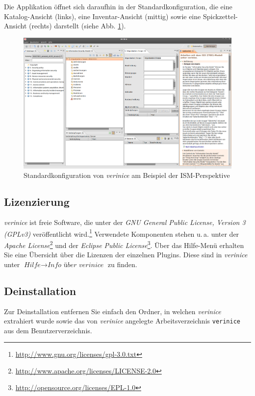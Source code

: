 \documentclass[a4paper,10pt]{book}
\newcommand{\ua}{\mbox{u.\,a.}\xspace}
\begin{document}
Die Applikation öffnet sich daraufhin in der Standardkonfiguration, die eine
Katalog-Ansicht (links), eine Inventar-Ansicht (mittig) sowie eine
Spickzettel-Ansicht (rechts) darstellt (siehe Abb.
\ref{fig:standardkonfiguration-von-verinice}).

\begin{figure}[htb!]
  \centering
  \includegraphics[scale=.21]{Screenshot/ISM-Perspektive.png}
  \caption{Standardkonfiguration von \textit{verinice} am Beispiel der
    ISM-Perspektive}
  \label{fig:standardkonfiguration-von-verinice}
\end{figure}


\subsection{Lizenzierung}

\textit{verinice} ist freie Software, die unter der \textit{GNU General Public
License, Version 3 (GPLv3)} veröffentlicht
wird.\footnote{\url{http://www.gnu.org/licenses/gpl-3.0.txt}} Verwendete
Komponenten stehen \ua unter der {\em Apache
License}\footnote{\url{http://www.apache.org/licenses/LICENSE-2.0}} und der {\em
Eclipse Public License}\footnote{\url{http://opensource.org/licenses/EPL-1.0}}.
Über das Hilfe-Menü erhalten Sie eine Übersicht über die Lizenzen der einzelnen
Plugins. Diese sind in \textit{verinice} unter $\textit{Hilfe}\to\textit{Info
über verinice}$ zu finden.


\subsection{Deinstallation}

Zur Deinstallation entfernen Sie einfach den Ordner, in welchen
\textit{verinice} extrahiert wurde sowie das von \textit{verinice} angelegte
Arbeitsverzeichnis \texttt{verinice} aus dem Benutzerverzeichnis.
\end{document}

